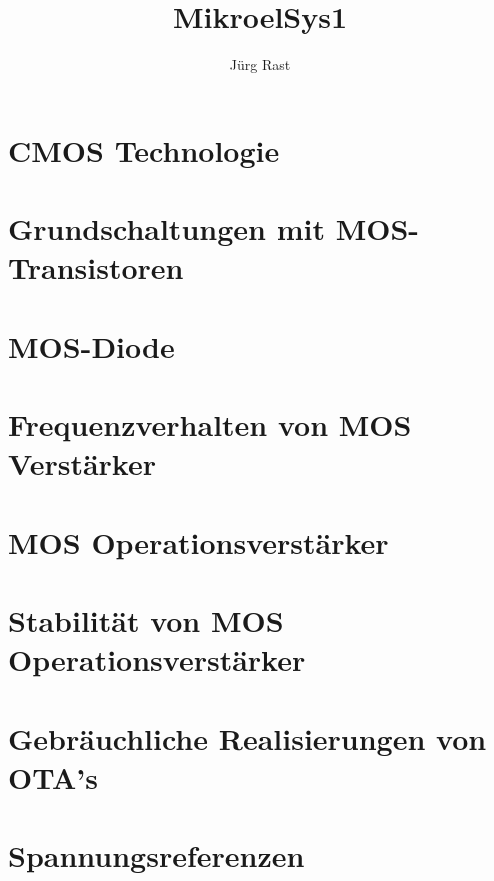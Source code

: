 \documentclass[titlepage=true]{scrartcl}
\title{MikroelSys1}
\author{Jürg Rast}
\begin{document}
\begin{titlepage}
	\thispagestyle{empty}
	\maketitle
\end{titlepage}

\tableofcontents
\newpage

\section{CMOS Technologie}





\section{Grundschaltungen mit MOS-Transistoren}

\section{MOS-Diode}







\section{Frequenzverhalten von MOS Verstärker}

\section{MOS Operationsverstärker}

\section{Stabilität von MOS Operationsverstärker}

\section{Gebräuchliche Realisierungen von OTA's}


\section{Spannungsreferenzen}
\end{document}
